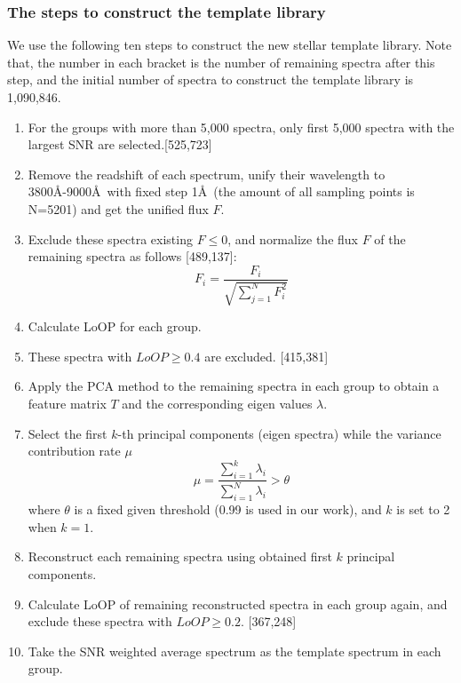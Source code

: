 \documentclass[manuscript]{aastex}
\begin{document}
\subsubsection{The steps to construct the template library}
We use the following ten steps to construct the new stellar template library.
Note that, the number in each bracket is the number of remaining spectra after this step,
and the initial number of spectra to construct the template library is 1,090,846.
\begin{enumerate}
\item For the groups with more than 5,000 spectra, only first 5,000 spectra with the largest SNR are selected.[525,723]
\item Remove the readshift of each spectrum, unify their wavelength to 3800\AA-9000\AA \ with fixed step 1\AA\ (the amount of all sampling points is N=5201) and  get the unified flux $F$.
  \item Exclude these spectra existing $F\le0$, and normalize the flux $F$ of the remaining spectra as follows [489,137]:
       \begin{equation}
        F_i=\frac{F_i}{\sqrt{\sum\limits_{j=1}^{N}F_i^2}}
       \end{equation}
 \item Calculate LoOP for each group.
 \item These spectra with  $LoOP\ge0.4$ are excluded. [415,381]
		

      \item Apply the PCA method to the remaining spectra in each group to  obtain a feature matrix $T$ and the corresponding eigen values $\lambda$.
      \item Select the first $k$-th principal components (eigen spectra) while the variance contribution rate $\mu$ 
      \begin{equation}
       \mu=\frac{\sum\limits_{i=1}^{k}\lambda_i}{\sum\limits_{i=1}^{N}\lambda_i}>\theta
      \end{equation}
      where $\theta$ is a fixed given threshold  (0.99 is used in our work),
       and $k$ is set to 2 when $k=1$.

     \item Reconstruct each remaining spectra using obtained first $k$ principal components.
     \item Calculate LoOP of remaining reconstructed spectra in each group again, and exclude these spectra with $LoOP\ge0.2$. [367,248]

      \item Take the SNR weighted average spectrum as the template spectrum in each group.
     \end{enumerate}
\end{document}
